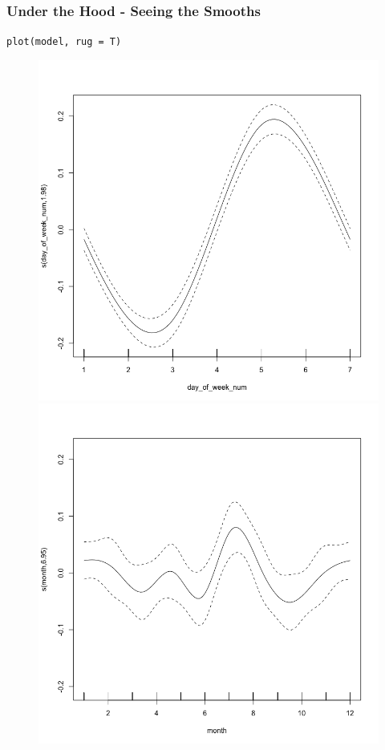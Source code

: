 \documentclass{beamer}
\begin{document}
\begin{frame}
\frametitle{Under the Hood - Seeing the Smooths}
\begin{center}
\texttt{plot(model, rug = T)}
\end{center}

\begin{figure}
\includegraphics[scale=.2]{figures/exampleSmooth1}
\includegraphics[scale=.2]{figures/exampleSmooth2}
\end{figure}


\end{frame}
\end{document}
